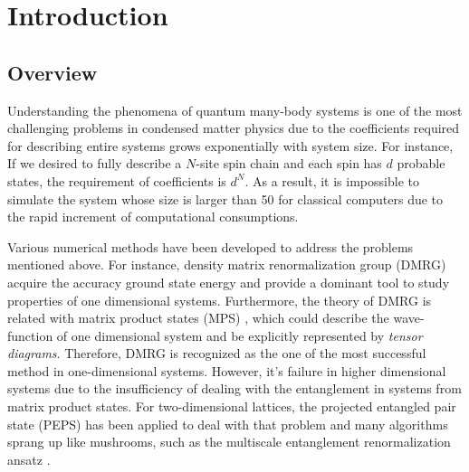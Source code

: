 \chapter{Introduction}
\label{chapter:Introduction}

\section{Overview}
\label{overview}

Understanding the phenomena of quantum many-body systems is one of the most challenging problems in condensed matter physics due to the coefficients required for describing entire systems grows exponentially with system size. For instance, If we desired to fully describe a $N$-site spin chain and each spin has $d$ probable states, the requirement of coefficients is $d^N$. As a result, it is impossible to simulate the system whose size is larger than 50 for classical computers due to the rapid increment of computational consumptions.

Various numerical methods have been developed to address the problems mentioned above. For instance, density matrix renormalization group (DMRG) \cite{PhysRevLett.69.2863} \cite{PhysRevB.48.10345} acquire the accuracy ground state energy and provide a dominant tool to study properties of one dimensional systems. Furthermore, the theory of DMRG is related with matrix product states (MPS) \cite{PhysRevB.73.094423} \cite{PhysRevLett.75.3537}, which could describe the wave-function of one dimensional system and be explicitly represented by \textit{tensor diagrams}. Therefore, DMRG is recognized as the one of the most successful method in one-dimensional systems. However, it's failure in higher dimensional systems due to the insufficiency of dealing with the entanglement in systems from matrix product states. For two-dimensional lattices, the projected entangled pair state (PEPS) \cite{PhysRevA.75.033605} \cite{jordan_studies_2011} has been applied to deal with that problem and many algorithms sprang up like mushrooms, such as the multiscale entanglement renormalization ansatz \cite{PhysRevLett.99.220405}.

